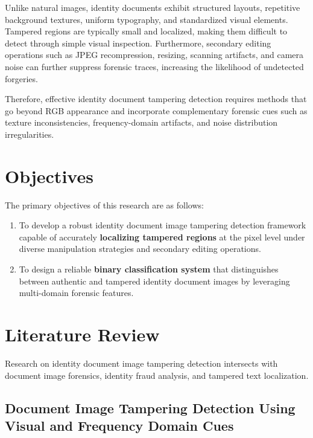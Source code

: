 \documentclass[12pt]{article}
\begin{document}
Unlike natural images, identity documents exhibit structured layouts, repetitive background textures, uniform typography, and standardized visual elements. Tampered regions are typically small and localized, making them difficult to detect through simple visual inspection. Furthermore, secondary editing operations such as JPEG recompression, resizing, scanning artifacts, and camera noise can further suppress forensic traces, increasing the likelihood of undetected forgeries.

Therefore, effective identity document tampering detection requires methods that go beyond RGB appearance and incorporate complementary forensic cues such as texture inconsistencies, frequency-domain artifacts, and noise distribution irregularities.

\section{Objectives}

The primary objectives of this research are as follows:

\begin{enumerate}
    \item To develop a robust identity document image tampering detection framework capable of accurately \textbf{localizing tampered regions} at the pixel level under diverse manipulation strategies and secondary editing operations.
    \item To design a reliable \textbf{binary classification system} that distinguishes between authentic and tampered identity document images by leveraging multi-domain forensic features.
\end{enumerate}

\section{Literature Review}

Research on identity document image tampering detection intersects with document image forensics, identity fraud analysis, and tampered text localization.

\subsection{Document Image Tampering Detection Using Visual and Frequency Domain Cues}
\end{document}
